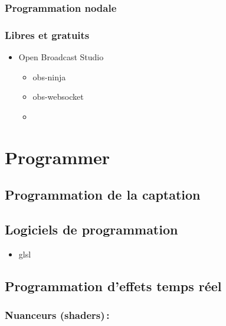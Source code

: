 \documentclass[
  french,
]{book}
\providecommand{\tightlist}{%
  \setlength{\itemsep}{0pt}\setlength{\parskip}{0pt}}
\begin{document}
\hypertarget{programmation-nodale}{%
\subsection{Programmation nodale}\label{programmation-nodale}}

\hypertarget{libres-et-gratuits}{%
\subsection{Libres et gratuits}\label{libres-et-gratuits}}

\begin{itemize}
\tightlist
\item
  Open Broadcast Studio

  \begin{itemize}
  \tightlist
  \item
    obs-ninja
  \item
    obs-websocket
  \item
  \end{itemize}
\end{itemize}

\hypertarget{programmer}{%
\chapter{Programmer}\label{programmer}}

\hypertarget{programmer_grab}{%
\section{Programmation de la captation}\label{programmer_grab}}

\hypertarget{programmer_logiciels}{%
\section{Logiciels de programmation}\label{programmer_logiciels}}

\begin{itemize}
\tightlist
\item
  glsl
\end{itemize}

\hypertarget{programmation-deffets-temps-ruxe9el}{%
\section{Programmation d'effets temps réel}\label{programmation-deffets-temps-ruxe9el}}

\hypertarget{nuanceurs-shaders}{%
\subsection{Nuanceurs (shaders)\,:}\label{nuanceurs-shaders}}
\end{document}
